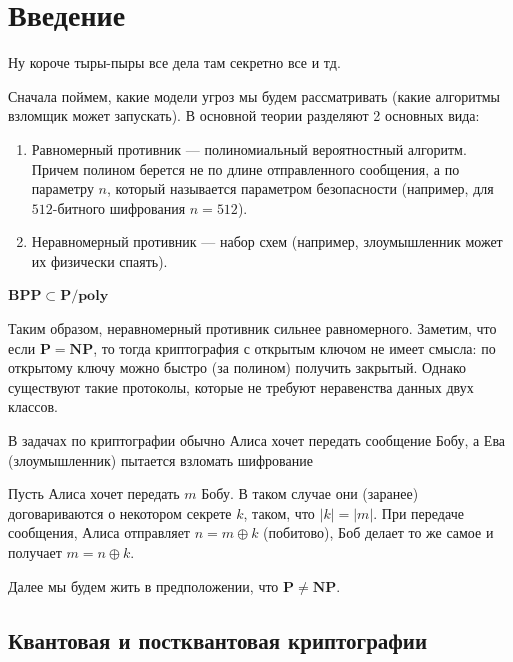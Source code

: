 
\section{Введение}
Ну короче тыры-пыры все дела там секретно все и тд. 

Сначала поймем, какие модели угроз мы будем рассматривать (какие алгоритмы взломщик может запускать). В основной теории разделяют 2 основных вида:

\begin{enumerate}
    \item Равномерный противник --- полиномиальный вероятностный алгоритм. Причем полином берется не по длине отправленного сообщения, а по параметру \(n\), который называется параметром безопасности (например, для \(512\)-битного шифрования \(n = 512\)).
    \item Неравномерный противник --- набор схем (например, злоумышленник может их физически спаять).
\end{enumerate}

\begin{reminder}
    \(\mathbf{BPP} \subset \mathbf{P/poly}\)
\end{reminder}

Таким образом, неравномерный противник сильнее равномерного. Заметим, что если \(\mathbf{P} = \mathbf{NP}\), то тогда криптография с открытым ключом не имеет смысла: по открытому ключу можно быстро (за полином) получить закрытый. Однако существуют такие протоколы, которые не требуют неравенства данных двух классов.

В задачах по криптографии обычно Алиса хочет передать сообщение Бобу, а Ева (злоумышленник) пытается взломать шифрование

\begin{example}
    Пусть Алиса хочет передать \(m\) Бобу. В таком случае они (заранее) договариваются о некотором секрете \(k\), таком, что \(|k| = |m|\). При передаче сообщения, Алиса отправляет \(n = m \oplus k\) (побитово), Боб делает то же самое и получает \(m = n \oplus k\).
\end{example}

Далее мы будем жить в предположении, что \(\mathbf{P} \ne \mathbf{NP}\).

\subsection{Квантовая и постквантовая криптографии}

